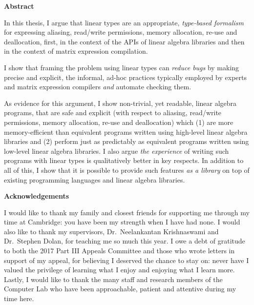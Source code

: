 \newpage
{\normalfont\Huge\sffamily\bfseries Abstract}
\vspace{24pt}

In this thesis, I argue that linear types are an appropriate, \emph{type-based
formalism} for expressing aliasing, read/write permissions, memory allocation,
re-use and deallocation, first, in the context of the APIs of linear algebra
libraries and then in the context of matrix expression compilation.

I show that framing the problem using linear types can \emph{reduce bugs}
by making precise and explicit, the informal, ad-hoc practices typically
employed by experts and matrix expression compilers \emph{and} automate
checking them.

As evidence for this argument, I show non-trivial, yet readable, linear algebra
programs, that are safe and explicit (with respect to aliasing, read/write
permissions, memory allocation, re-use and deallocation) which (1) are more
memory-efficient than equivalent programs written using high-level
linear algebra libraries and (2) perform just as predictably as equivalent
programs written using low-level linear algebra libraries. I also argue
\emph{the experience} of writing such programs with linear types is
qualitatively better in key respects. In addition to all of this, I show that
it is possible to provide such features \emph{as a library} on top of existing
programming languages and linear algebra libraries.

\vspace*{\fill}
{\normalfont\Huge\sffamily\bfseries Acknowledgements}

I would like to thank my family and closest friends for supporting me through
my time at Cambridge: you have been my strength when I have had none. I would
also like to thank my supervisors, Dr\@.~Neelankantan Krishnaswami and
Dr\@.~Stephen Dolan, for teaching me so much this year. I owe a debt of
gratitude to both the 2017 Part III Appeals Committee and those who wrote
letters in support of my appeal, for believing I deserved the chance to stay
on: never have I valued the privilege of learning what I enjoy and enjoying
what I learn more.  Lastly, I would like to thank the many staff and research
members of the Computer Lab who have been approachable, patient and attentive
during my time here.

\newpage
\vspace*{\fill}
